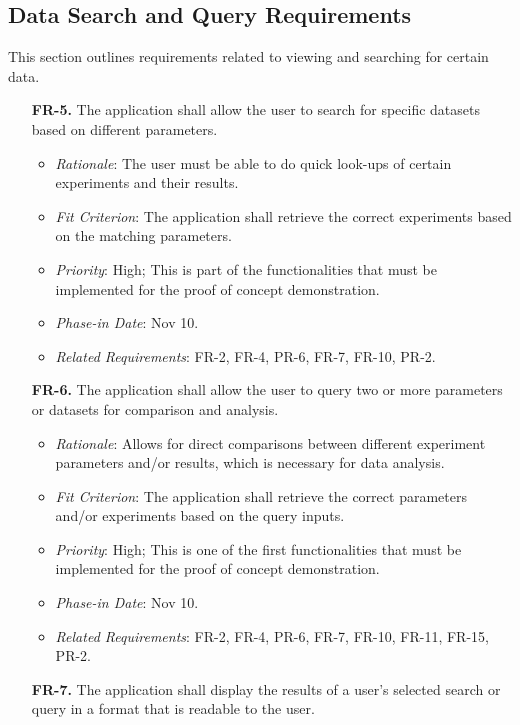 \documentclass[12pt]{article}
\begin{document}
\subsection{Data Search and Query Requirements}
This section outlines requirements related to viewing and searching for certain
data.
\begin{enumerate}
  \item[\textbf{FR-5.}] The application shall allow the user to search for specific datasets based on different parameters.
  \begin{itemize}
    \item \textit{Rationale}: The user must be able to do quick look-ups of certain experiments and their results.
    \item \textit{Fit Criterion}: The application shall retrieve the correct experiments based on the matching parameters.
    \item \textit{Priority}: High; This is part of the functionalities that must be implemented for the proof of concept demonstration.
    \item \textit{Phase-in Date}: Nov 10.
    \item \textit{Related Requirements}: FR-2, FR-4, PR-6, FR-7, FR-10, PR-2.
  \end{itemize}
  \item[\textbf{FR-6.}] The application shall allow the user to query two or more parameters or datasets for comparison and analysis.
  \begin{itemize}
    \item \textit{Rationale}: Allows for direct comparisons between different experiment parameters and/or results, which is necessary for data analysis.
    \item \textit{Fit Criterion}: The application shall retrieve the correct parameters and/or experiments based on the query inputs.
    \item \textit{Priority}: High; This is one of the first functionalities that must be implemented for the proof of concept demonstration.
    \item \textit{Phase-in Date}: Nov 10.
    \item \textit{Related Requirements}: FR-2, FR-4, PR-6, FR-7, FR-10, FR-11, FR-15, PR-2.
  \end{itemize}
  \item[\textbf{FR-7.}] The application shall display the results of a user’s selected search or query in a format that is readable to the user.
  \begin{itemize}

\end{itemize}
\end{enumerate}
\end{document}

